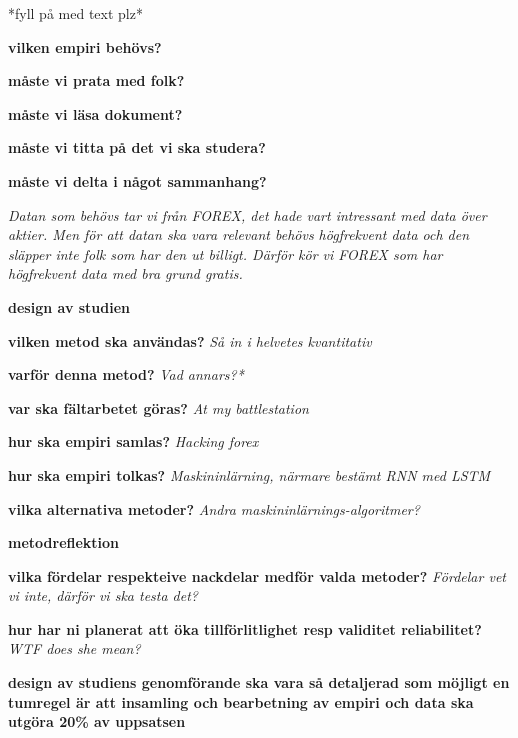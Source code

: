*fyll på med text plz*

\textbf{vilken empiri behövs?}

\textbf{måste vi prata med folk?}

\textbf{måste vi läsa dokument?}

\textbf{måste vi titta på det vi ska studera?}

\textbf{måste vi delta i något sammanhang?}

\textit{Datan som behövs tar vi från FOREX, det hade vart intressant med data över aktier. Men för att datan ska vara relevant behövs högfrekvent data och den släpper inte folk som har den ut billigt. Därför kör vi FOREX som har högfrekvent data med bra grund gratis.}

\textbf{design av studien}

\textbf{vilken metod ska användas?}
\textit{Så in i helvetes kvantitativ}

\textbf{varför denna metod?}
\textit{Vad annars?*}

\textbf{var ska fältarbetet göras?}
\textit{At my battlestation}

\textbf{hur ska empiri samlas?}
\textit{Hacking forex}

\textbf{hur ska empiri tolkas?}
\textit{Maskininlärning, närmare bestämt RNN med LSTM}

\textbf{vilka alternativa metoder?}
\textit{Andra maskininlärnings-algoritmer?}

\textbf{metodreflektion}

\textbf{vilka fördelar respekteive nackdelar medför valda metoder?}
\textit{Fördelar vet vi inte, därför vi ska testa det?}

\textbf{hur har ni planerat att öka tillförlitlighet resp validitet reliabilitet?}
\textit{WTF does she mean?}

\textbf{design av studiens genomförande ska vara så detaljerad som möjligt en tumregel är att insamling och bearbetning av empiri och data ska utgöra 20\% av uppsatsen}
